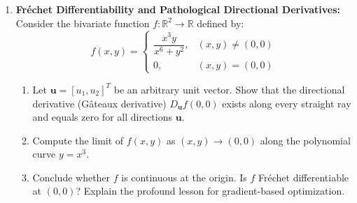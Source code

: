 \begin{enumerate}[label=\textbf{P\arabic*.}]
    \item \textbf{Fréchet Differentiability and Pathological Directional Derivatives:}
    Consider the bivariate function $f: \mathbb{R}^2 \to \mathbb{R}$ defined by:
    \begin{equation}
    f(x, y) = \begin{cases} \dfrac{x^3 y}{x^6 + y^2}, & (x, y) \ne (0, 0) \\ 0, & (x, y) = (0, 0) \end{cases}
    \end{equation}
    \begin{enumerate}[label=(\alph*)]
        \item Let $\mathbf{u} = [u_1, u_2]^T$ be an arbitrary unit vector. Show that the directional derivative (Gâteaux derivative) $D_{\mathbf{u}} f(0, 0)$ exists along every straight ray and equals zero for all directions $\mathbf{u}$.
        \item Compute the limit of $f(x, y)$ as $(x, y) \to (0, 0)$ along the polynomial curve $y = x^3$.
        \item Conclude whether $f$ is continuous at the origin. Is $f$ Fréchet differentiable at $(0, 0)$? Explain the profound lesson for gradient-based optimization.
    \end{enumerate}


\end{enumerate}
